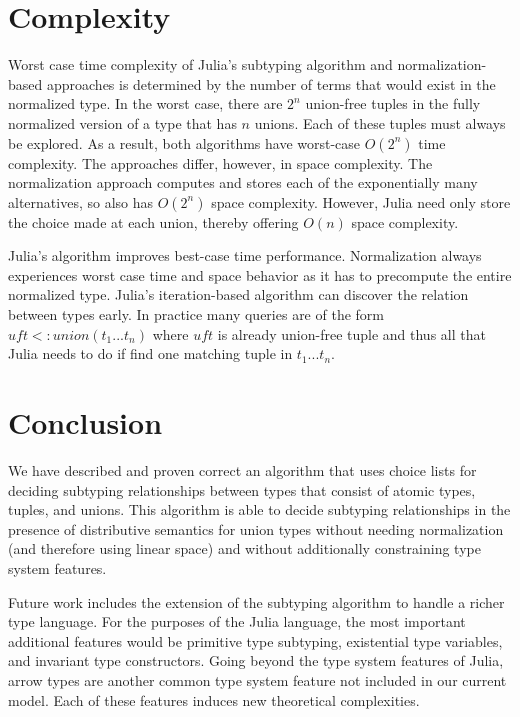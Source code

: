 \documentclass[a4paper,english]{lipics-v2019}
\begin{document}
\section{Complexity}

Worst case time complexity of Julia's subtyping algorithm and
normalization-based approaches is determined by the number of terms that
would exist in the normalized type. In the worst case, there are $2^n$
union-free tuples in the fully normalized version of a type that has $n$
unions.  Each of these tuples must always be explored. As a result, both
algorithms have worst-case $O(2^n)$ time complexity. The approaches differ,
however, in space complexity. The normalization approach computes and stores
each of the exponentially many alternatives, so also has $O(2^n)$ space
complexity. However, Julia need only store the choice made at each union,
thereby offering $O(n)$ space complexity.

Julia's algorithm improves best-case time performance.  Normalization always
experiences worst case time and space behavior as it has to precompute the
entire normalized type. Julia's iteration-based algorithm can discover the
relation between types early. In practice many queries are of the form
$\mathit{uft} <: union(t_1...t_n)$ where $\mathit{uft}$ is already
union-free tuple and thus all that Julia needs to do if find one matching
tuple in $t_1 ... t_n$.

\section{Conclusion}

We have described and proven correct an algorithm that uses choice lists for deciding
subtyping relationships between types that consist of atomic types, tuples,
and unions. This algorithm is able to decide subtyping relationships in the
presence of distributive semantics for union types without needing
normalization (and therefore using linear space) and without additionally
constraining type system features.

Future work includes the extension of the subtyping algorithm to handle a
richer type language. For the purposes of the Julia language, the most
important additional features would be primitive type subtyping, existential
type variables, and invariant type constructors. Going beyond the type system
features of Julia, arrow types are another common type system feature not included
in our current model. Each of these features induces new theoretical complexities.
\end{document}

